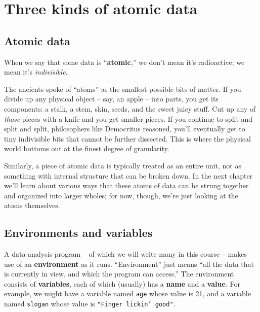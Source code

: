 
%

\chapter{Three kinds of atomic data}

\section{Atomic data}

When we say that some data is ``\textbf{atomic},'' we don't mean it's
radioactive; we mean it's \textit{indivisible}.

The ancients spoke of ``atoms'' as the smallest possible bits of matter. If you
divide up any physical object -- say, an apple -- into parts, you get its
components: a stalk, a stem, skin, seeds, and the sweet juicy stuff. Cut up any
of \textit{those} pieces with a knife and you get smaller pieces. If you
continue to split and split and split, philosophers like Democritus reasoned,
you'll eventually get to tiny indivisible bits that cannot be further
dissected. This is where the physical world bottoms out at the finest degree of
granularity.

Similarly, a piece of atomic data is typically treated as an entire unit, not
as something with internal structure that can be broken down. In the next
chapter we'll learn about various ways that these atoms of data can be strung
together and organized into larger wholes; for now, though, we're just looking
at the atoms themselves.

\section{Environments and variables}

A data analysis program -- of which we will write many in this course -- makes
use of an \textbf{environment} as it runs. ``Environment'' just means ``all the
data that is currently in view, and which the program can access.'' The
environment consists of \textbf{variables}, each of which (usually) has a
\textbf{name} and a \textbf{value}. For example, we might have a variable named
\texttt{age} whose value is 21, and a variable named \texttt{slogan} whose
value is \texttt{"Finger lickin' good"}.

